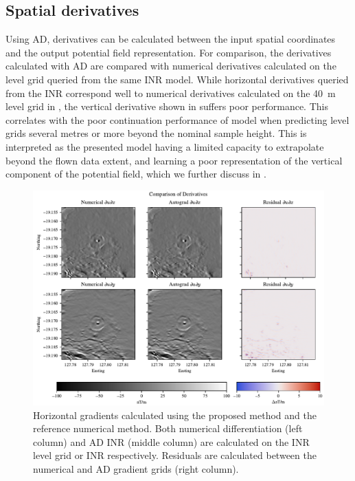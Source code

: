 

\subsection{Spatial derivatives}
Using AD, derivatives can be calculated between the input spatial coordinates and the output potential field representation.
For comparison, the derivatives calculated with AD are compared with numerical derivatives calculated on the level grid queried from the same INR model.
While horizontal derivatives queried from the INR correspond well to numerical derivatives calculated on the \qty{40}{\m} level grid in , the vertical derivative shown in  suffers poor performance.
This correlates with the poor continuation performance of model when predicting level grids several metres or more beyond the nominal sample height.
This is interpreted as the presented model having a limited capacity to extrapolate beyond the flown data extent, and learning a poor representation of the vertical component of the potential field, which we further discuss in .

\begin{landscape}
    \begin{figure}[hbtp]
        \centering{}
        \includegraphics[width=0.8\linewidth]{fig/p3/P864_dh_comparison.pdf}
        \caption[Horizontal derivatives]{Horizontal gradients calculated using the proposed method and the reference numerical method.
            Both numerical differentiation (left column) and AD INR (middle column) are calculated on the INR level grid or INR respectively.
            Residuals are calculated between the numerical and AD gradient grids (right column).}
        \label{fig:horigrad}
    \end{figure}
\end{landscape}

